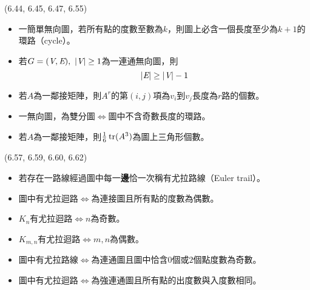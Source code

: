 \item \begin{theorem}{(6.44, 6.45, 6.47, 6.55)} \quad\quad
    \begin{itemize}
        \item 一簡單無向圖，若所有點的度數至數為$k$，則圖上必含一個長度至少為$k + 1$的環路（cycle）。
        \item 若$G = (\textit{V}, \textit{E}), \ |\textit{V}| \ge 1$為一連通無向圖，則\begin{equation}
            |\textit{E}| \ge |\textit{V}| - 1
        \end{equation}
        \item 若$A$為一鄰接矩陣，則$A^r$的第$(i, j)$項為$v_i$到$v_j$長度為$r$路的個數。
        \item 一無向圖，為雙分圖$\iff$圖中不含奇數長度的環路。
        \item 若$A$為一鄰接矩陣，則$\frac{1}{6}\operatorname{tr}(A^3)$為圖上三角形個數。
    \end{itemize}
\end{theorem}

\item \begin{theorem}{(6.57, 6.59, 6.60, 6.62)} \quad\quad
    \begin{itemize}
        \item 若存在一路線經過圖中每一\textbf{邊}恰一次稱有尤拉路線（Euler trail）。
        \item 圖中有尤拉迴路$\iff$為連接圖且所有點的度數為偶數。
        \item $K_n$有尤拉迴路$\iff$$n$為奇數。
        \item $K_{m, n}$有尤拉迴路$\iff$$m, n$為偶數。
        \item 圖中有尤拉路線$\iff$為連通圖且圖中恰含$0$個或$2$個點度數為奇數。
        \item 圖中有尤拉迴路$\iff$為強連通圖且所有點的出度數與入度數相同。
    \end{itemize}
\end{theorem}

